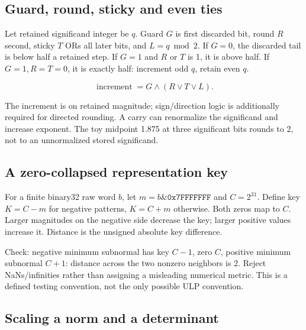 \subsection{Guard, round, sticky and even ties}\label{03-visual-computing-i-ch018-guard-round-sticky-and-even-ties}

\hypertarget{03-visual-computing-i-ch018-guard-round-sticky-and-even-ties}{}

Let retained significand integer be \(q\). Guard \(G\) is first discarded bit, round \(R\) second, sticky \(T\) ORs all later bits, and \(L=q\bmod2\). If \(G=0\), the discarded tail is below half a retained step. If \(G=1\) and \(R\) or \(T\) is 1, it is above half. If \(G=1,R=T=0\), it is exactly half: increment odd \(q\), retain even \(q\).

\[
\operatorname{increment}=G\land(R\lor T\lor L).
\]

The increment is on retained magnitude; sign/direction logic is additionally required for directed rounding. A carry can renormalize the significand and increase exponent. The toy midpoint 1.875 at three significant bits rounds to 2, not to an unnormalized stored significand.

\subsection{A zero-collapsed representation key}\label{03-visual-computing-i-ch018-a-zero-collapsed-representation-key}

\hypertarget{03-visual-computing-i-ch018-a-zero-collapsed-representation-key}{}

For a finite binary32 raw word \(b\), let \(m=b\mathbin{\&}\texttt{0x7FFFFFFF}\) and \(C=2^{31}\). Define key \(K=C-m\) for negative patterns, \(K=C+m\) otherwise. Both zeros map to \(C\). Larger magnitudes on the negative side decrease the key; larger positive values increase it. Distance is the unsigned absolute key difference.

Check: negative minimum subnormal has key \(C-1\), zero \(C\), positive minimum subnormal \(C+1\): distance across the two nonzero neighbors is 2. Reject NaNs/infinities rather than assigning a misleading numerical metric. This is a defined testing convention, not the only possible ULP convention.

\subsection{Scaling a norm and a determinant}\label{03-visual-computing-i-ch018-scaling-a-norm-and-a-determinant}

